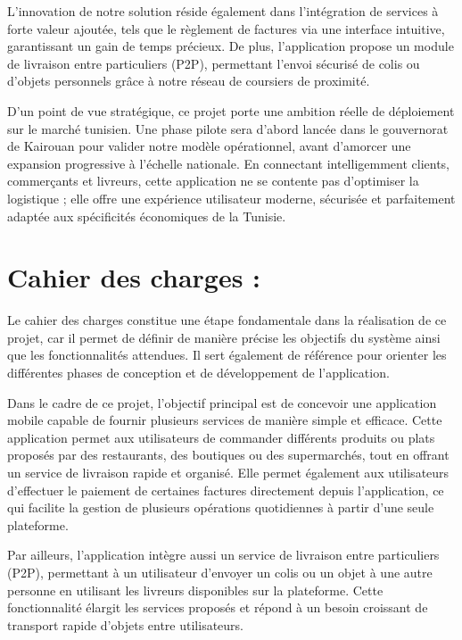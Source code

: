 \documentclass[12pt,fleqn,a4paper]{report}
\begin{document}
\begin{justify}
\vspace{0.4cm}
L'innovation de notre solution réside également dans l'intégration de services à forte valeur ajoutée, tels que le règlement de factures via une interface intuitive, garantissant un gain de temps précieux. De plus, l'application propose un module de livraison entre particuliers (P2P), permettant l'envoi sécurisé de colis ou d'objets personnels grâce à notre réseau de coursiers de proximité.

\vspace{0.4cm}
D'un point de vue stratégique, ce projet porte une ambition réelle de déploiement sur le marché tunisien. Une phase pilote sera d'abord lancée dans le gouvernorat de Kairouan pour valider notre modèle opérationnel, avant d'amorcer une expansion progressive à l'échelle nationale. En connectant intelligemment clients, commerçants et livreurs, cette application ne se contente pas d'optimiser la logistique ; elle offre une expérience utilisateur moderne, sécurisée et parfaitement adaptée aux spécificités économiques de la Tunisie.

\section{Cahier des charges :}
Le cahier des charges constitue une étape fondamentale dans la réalisation de ce projet, car il permet de définir de manière précise les objectifs du système ainsi que les fonctionnalités attendues. Il sert également de référence pour orienter les différentes phases de conception et de développement de l'application.

Dans le cadre de ce projet, l'objectif principal est de concevoir une application mobile capable de fournir plusieurs services de manière simple et efficace. Cette application permet aux utilisateurs de commander différents produits ou plats proposés par des restaurants, des boutiques ou des supermarchés, tout en offrant un service de livraison rapide et organisé. Elle permet également aux utilisateurs d'effectuer le paiement de certaines factures directement depuis l'application, ce qui facilite la gestion de plusieurs opérations quotidiennes à partir d'une seule plateforme.

Par ailleurs, l'application intègre aussi un service de livraison entre particuliers (P2P), permettant à un utilisateur d'envoyer un colis ou un objet à une autre personne en utilisant les livreurs disponibles sur la plateforme. Cette fonctionnalité élargit les services proposés et répond à un besoin croissant de transport rapide d'objets entre utilisateurs.


\end{justify}
\end{document}
